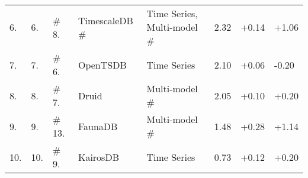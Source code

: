 \begin{table}[htbp]
\begin{tabular}{@{}llllllll@{}}
6.                                                                              & 6.                                                                              & \# 8.                                                                           & TimescaleDB \#                                     & Time Series, Multi-model \#                                  & 2.32                                                                            & +0.14                                                                           & +1.06                                                                           \\
7.                                                                              & 7.                                                                              & \# 6.                                                                           & OpenTSDB                                           & Time Series                                                  & 2.10                                                                            & +0.06                                                                           & -0.20                                                                           \\
8.                                                                              & 8.                                                                              & \# 7.                                                                           & Druid                                              & Multi-model \#                                               & 2.05                                                                            & +0.10                                                                           & +0.20                                                                           \\
9.                                                                              & 9.                                                                              & \# 13.                                                                          & FaunaDB                                            & Multi-model \#                                               & 1.48                                                                            & +0.28                                                                           & +1.14                                                                           \\
10.                                                                             & 10.                                                                             & \# 9.                                                                           & KairosDB                                           & Time Series                                                  & 0.73                                                                            & +0.12                                                                           & +0.20                                                                           \\ \bottomrule

\end{tabular}
\end{table}
